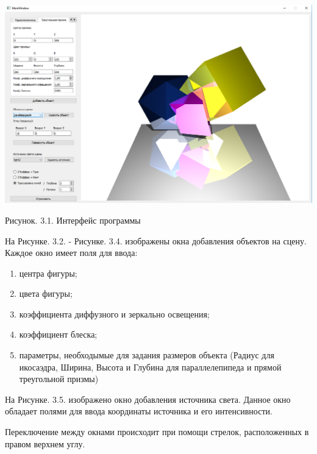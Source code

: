 \documentclass[12pt]{report}
\begin{document}
	\begin{center}
		\includegraphics[scale=0.45]{UI.png}
		
		Рисунок. 3.1. Интерфейс программы
	\end{center}	

	
	На Рисунке. 3.2. - Рисунке. 3.4. изображены окна добавления объектов на сцену.
	Каждое окно имеет поля для ввода:
	\begin{enumerate}
		\item центра фигуры;
		\item цвета фигуры;
		\item коэффициента диффузного и зеркально освещения;
		\item коэффициент блеска;
		\item параметры, необходымые для задания размеров объекта (Радиус для икосаэдра, Ширина, Высота и Глубина для параллелепипеда и прямой треугольной призмы)
	\end{enumerate}

	На Рисунке. 3.5. изображено окно добавления источника света. Данное окно обладает полями для ввода координаты источника и его интенсивности.
	
	Переключение между окнами происходит при помощи стрелок, расположенных в правом верхнем углу.
	
	~\\
	
\end{document}
